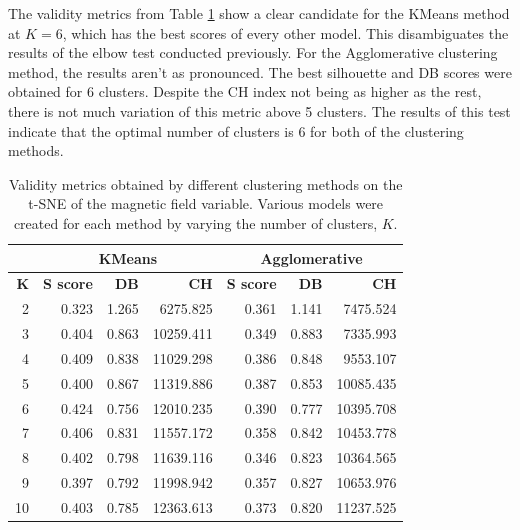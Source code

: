 The validity metrics from Table \ref{tab:tsne_b} show a clear candidate for the KMeans method at $K=6$, which has the best scores of every other model. This disambiguates the results of the elbow test conducted previously. For the Agglomerative clustering method, the results aren't as pronounced. The best silhouette and DB scores were obtained for 6 clusters. Despite the CH index not being as higher as the rest, there is not much variation of this metric above 5 clusters. The results of this test indicate that the optimal number of clusters is 6 for both of the clustering methods.

\begin{table}[h]
    \caption[Validity metrics for t-SNE of the Magnetic Field]{Validity metrics obtained by different clustering methods on the t-SNE of the magnetic field variable. Various models were created for each method by varying the number of clusters, $K$.}\label{tab:tsne_b}
    \begin{tabular}{@{}rrrr|rrr@{}}
    \cmidrule(l){2-7}
    \multicolumn{1}{l}{}            & \multicolumn{3}{c|}{\textbf{KMeans}}         & \multicolumn{3}{c}{\textbf{Agglomerative}}   \\ \midrule
    \multicolumn{1}{r|}{\textbf{K}} & \textbf{S score} & \textbf{DB} & \textbf{CH} & \textbf{S score} & \textbf{DB} & \textbf{CH} \\ \midrule
    \multicolumn{1}{r|}{2}          & 0.323            & 1.265       & 6275.825    & 0.361            & 1.141       & 7475.524    \\
    \multicolumn{1}{r|}{3}          & 0.404            & 0.863       & 10259.411   & 0.349            & 0.883       & 7335.993    \\
    \multicolumn{1}{r|}{4}          & 0.409            & 0.838       & 11029.298   & 0.386            & 0.848       & 9553.107    \\
    \multicolumn{1}{r|}{5}          & 0.400            & 0.867       & 11319.886   & 0.387            & 0.853       & 10085.435   \\
    \multicolumn{1}{r|}{6}          & 0.424            & 0.756       & 12010.235   & 0.390            & 0.777       & 10395.708   \\
    \multicolumn{1}{r|}{7}          & 0.406            & 0.831       & 11557.172   & 0.358            & 0.842       & 10453.778   \\
    \multicolumn{1}{r|}{8}          & 0.402            & 0.798       & 11639.116   & 0.346            & 0.823       & 10364.565   \\
    \multicolumn{1}{r|}{9}          & 0.397            & 0.792       & 11998.942   & 0.357            & 0.827       & 10653.976   \\
    \multicolumn{1}{r|}{10}         & 0.403            & 0.785       & 12363.613   & 0.373            & 0.820       & 11237.525   \\ \bottomrule
    \end{tabular}
    \end{table}

